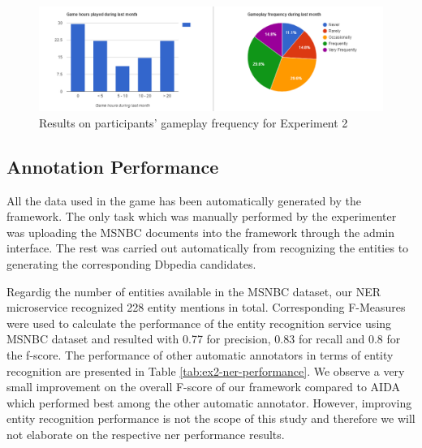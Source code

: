\begin{figure}[]
    \centering
    \includegraphics[width=\linewidth]{figures/experiment2/game-prequestionnaire.PNG}
    \caption{Results on participants' gameplay frequency for Experiment 2}
    \label{fig:game-prequestionnaire}
\end{figure}

\subsection{Annotation Performance}
All the data used in the game has been automatically generated by the framework. The only task which was manually performed by the experimenter was uploading the MSNBC documents into the framework through the admin interface. The rest was carried out automatically from recognizing the entities to generating the corresponding Dbpedia candidates. 

Regardig the number of entities available in the MSNBC dataset, our NER microservice recognized 228 entity mentions in total. Corresponding F-Measures were used to calculate the performance of the entity recognition service using MSNBC dataset and resulted with 0.77 for precision, 0.83 for recall and 0.8 for the f-score. The performance of other automatic annotators in terms of entity recognition are presented in Table \ref{tab:ex2-ner-performance}. We observe a very small improvement on the overall F-score of our framework compared to AIDA which performed best among the other automatic annotator. However, improving entity recognition performance is not the scope of this study and therefore we will not elaborate on the respective \ac{ner} performance results. 


